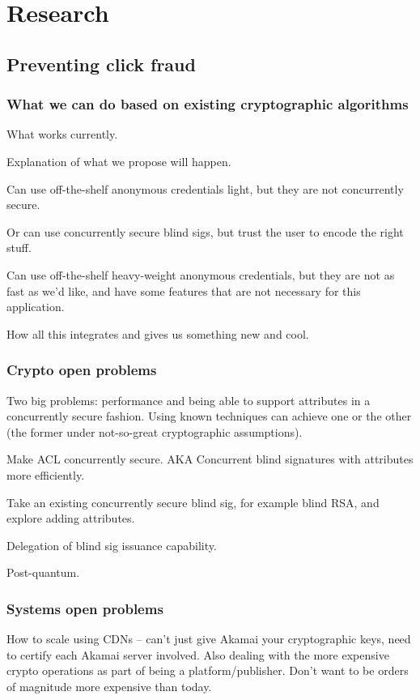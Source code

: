 \section{Research}
\label{r:stuff}

\subsection{Preventing click fraud}

\subsubsection{What we can do based on existing cryptographic algorithms}
What works currently. %

Explanation of what we propose will happen. %

Can use off-the-shelf anonymous credentials light, but they are not concurrently secure. %

Or can use concurrently secure blind sigs, but trust the user to encode the right stuff. %

Can use off-the-shelf heavy-weight anonymous credentials, but they are not as fast as we'd like, and have some features that are not necessary for this application. %

How all this integrates and gives us something new and cool. %

\subsubsection{Crypto open problems}

Two big problems: performance and being able to support attributes in a concurrently secure fashion.  Using known techniques can achieve one or the other (the former under not-so-great cryptographic assumptions).

Make ACL concurrently secure.  AKA Concurrent blind signatures with attributes more efficiently.

Take an existing concurrently secure blind sig, for example blind RSA, and explore adding attributes.  

Delegation of blind sig issuance capability.

Post-quantum.

\subsubsection{Systems open problems}
How to scale using CDNs -- can't just give Akamai your cryptographic keys, need to certify each Akamai server involved. Also dealing with the more expensive crypto operations as part of being a platform/publisher.  Don't want to be orders of magnitude more expensive than today.

